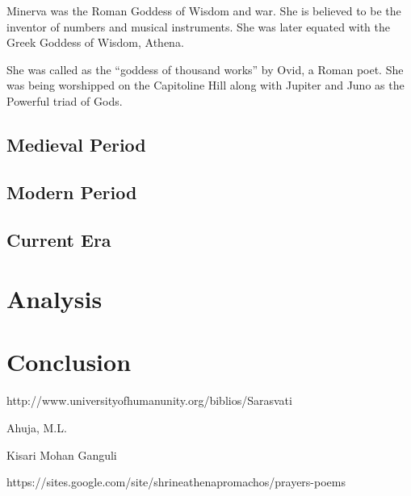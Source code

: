 \documentclass[a4paper,10pt]{article}
\begin{document}
\newblock
Minerva was the Roman Goddess of Wisdom and war. She is believed to be the inventor of numbers and musical instruments. She was later equated with the Greek Goddess of Wisdom, Athena.

She was called as the “goddess of thousand works” by Ovid, a Roman poet. She was being worshipped on the Capitoline Hill along with Jupiter and Juno as the Powerful triad of Gods.

\subsection{Medieval Period}
\subsection{Modern Period}
\subsection{Current Era}
\section{Analysis}
\section{Conclusion}
\begin{thebibliography}{9}

http://www.universityofhumanunity.org/biblios/Sarasvati%

Ahuja, M.L. 

 Kisari Mohan Ganguli

https://sites.google.com/site/shrineathenapromachos/prayers-poems

\end{thebibliography}
\end{document}
